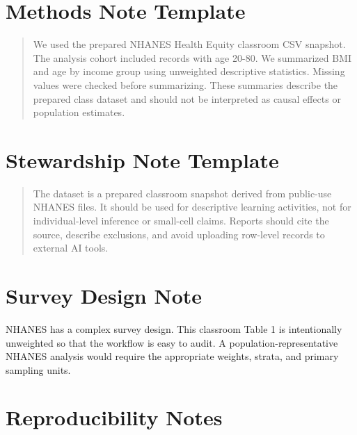 \documentclass[
  letterpaper,
  DIV=11,
  numbers=noendperiod,
  oneside]{scrreprt}
\begin{document}
\section*{Methods Note Template}\label{methods-note-template}


\begin{quote}
We used the prepared NHANES Health Equity classroom CSV snapshot. The
analysis cohort included records with age 20-80. We summarized BMI and
age by income group using unweighted descriptive statistics. Missing
values were checked before summarizing. These summaries describe the
prepared class dataset and should not be interpreted as causal effects
or population estimates.
\end{quote}

\section*{Stewardship Note Template}\label{stewardship-note-template}


\begin{quote}
The dataset is a prepared classroom snapshot derived from public-use
NHANES files. It should be used for descriptive learning activities, not
for individual-level inference or small-cell claims. Reports should cite
the source, describe exclusions, and avoid uploading row-level records
to external AI tools.
\end{quote}

\section*{Survey Design Note}\label{survey-design-note}


NHANES has a complex survey design. This classroom Table 1 is
intentionally unweighted so that the workflow is easy to audit. A
population-representative NHANES analysis would require the appropriate
weights, strata, and primary sampling units.

\section*{Reproducibility Notes}\label{reproducibility-notes}
\end{document}
